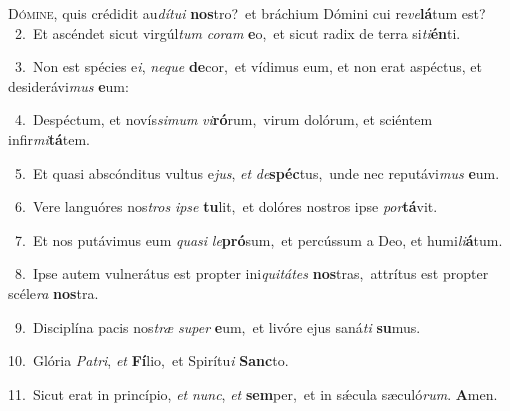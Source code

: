\lettrine{\initial\textcolor{\initialcolor}{D}}{ómine,} quis crédidit au\-\textit{dí}\-\textit{tu}\textit{i} \textbf{nos}\-tro?~\star et bráchium Dómini cui re\-\textit{ve}\-\textbf{lá}tum est?\\
{\numbfont\textcolor{\numbcolor}{~2.}}~Et ascéndet sicut virgúl\textit{tum} \textit{co}\-\textit{ram} \textbf{e}\-o,~\star et sicut radix de terra si\-\textit{ti}\-\textbf{én}ti.\par
{\numbfont\textcolor{\numbcolor}{~3.}}~Non est spécies e\-\textit{i}\-, \textit{ne}\-\textit{que} \textbf{de}\-cor,~\star et vídimus eum, et non erat aspéctus, et desiderávi\textit{mus} \textbf{e}\-um:\par
{\numbfont\textcolor{\numbcolor}{~4.}}~Despéctum, et novís\-\textit{si}\-\textit{mum} \textit{vi}\-\textbf{ró}rum,~\star virum dolórum, et sciéntem infir\-\textit{mi}\-\textbf{tá}tem.\par
{\numbfont\textcolor{\numbcolor}{~5.}}~Et quasi abscónditus vultus e\-\textit{jus}\-, \textit{et} \textit{de}\-\textbf{spéc}tus,~\star unde nec reputávi\textit{mus} \textbf{e}\-um.\par
{\numbfont\textcolor{\numbcolor}{~6.}}~Vere languóres nos\textit{tros} \textit{ip}\-\textit{se} \textbf{tu}\-lit,~\star et dolóres nostros ipse \textit{por}\-\textbf{tá}vit.\par
{\numbfont\textcolor{\numbcolor}{~7.}}~Et nos putávimus eum \textit{qua}\-\textit{si} \textit{le}\-\textbf{pró}sum,~\star et percússum a Deo, et humi\-\textit{li}\-\textbf{á}tum.\par
{\numbfont\textcolor{\numbcolor}{~8.}}~Ipse autem vulnerátus est propter ini\-\textit{qui}\-\textit{tá}\textit{tes} \textbf{nos}\-tras,~\star attrítus est propter scéle\textit{ra} \textbf{nos}\-tra.\par
{\numbfont\textcolor{\numbcolor}{~9.}}~Disciplína pacis nos\textit{træ} \textit{su}\-\textit{per} \textbf{e}\-um,~\star et livóre ejus saná\textit{ti} \textbf{su}\-mus.\par
{\numbfont\textcolor{\numbcolor}{10.}}~Glória \textit{Pa}\-\textit{tri}, \textit{et} \textbf{Fí}\-lio,~\star et Spirítu\textit{i} \textbf{Sanc}\-to.\par
{\numbfont\textcolor{\numbcolor}{11.}}~Sicut erat in princípio, \textit{et} \textit{nunc}\-, \textit{et} \textbf{sem}\-per,~\star et in sǽcula sæculó\-\textit{rum}\-. \textbf{A}\-men.\par
